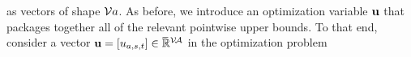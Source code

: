 \documentclass{article}
\newcommand\otodo[2][]{\todo[color=olicolor!30!white,#1]{#2}}
\begin{document}
as vectors of shape $\mathcal V a$.
As before, we introduce an optimization variable $\mathbf{u}$ that packages together
    all of the relevant pointwise upper bounds.
To that end, consider a 
vector
$\mathbf{u} = [u_{a,s,t}] \in \mskip1mu\overline{\mskip-1mu\mathbb R\!}\,^{\mathcal V\!\mathcal A}$
in the optimization problem
%
%
\end{document}
